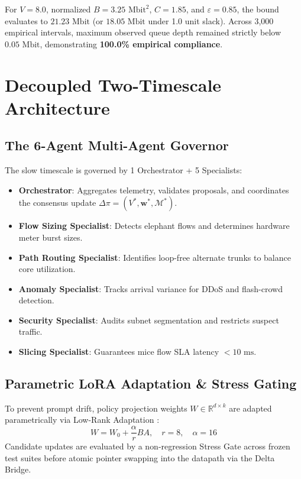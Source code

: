 \documentclass[conference]{IEEEtran}
\begin{document}
For $V=8.0$, normalized $B=3.25\text{ Mbit}^2$, $C=1.85$, and $\varepsilon=0.85$, the bound evaluates to $21.23\text{ Mbit}$ (or $18.05\text{ Mbit}$ under 1.0 unit slack). Across 3,000 empirical intervals, maximum observed queue depth remained strictly below $0.05\text{ Mbit}$, demonstrating \textbf{100.0\% empirical compliance}.

\section{Decoupled Two-Timescale Architecture}
\subsection{The 6-Agent Multi-Agent Governor}
The slow timescale is governed by 1 Orchestrator + 5 Specialists:
\begin{itemize}
    \item \textbf{Orchestrator}: Aggregates telemetry, validates proposals, and coordinates the consensus update $\Delta\pi = (V^*, \mathbf{w}^*, \mathcal{M}^*)$.
    \item \textbf{Flow Sizing Specialist}: Detects elephant flows and determines hardware meter burst sizes.
    \item \textbf{Path Routing Specialist}: Identifies loop-free alternate trunks to balance core utilization.
    \item \textbf{Anomaly Specialist}: Tracks arrival variance for DDoS and flash-crowd detection.
    \item \textbf{Security Specialist}: Audits subnet segmentation and restricts suspect traffic.
    \item \textbf{Slicing Specialist}: Guarantees mice flow SLA latency $< 10\text{ ms}$.
\end{itemize}

\subsection{Parametric LoRA Adaptation \& Stress Gating}
To prevent prompt drift, policy projection weights $W \in \mathbb{R}^{d \times k}$ are adapted parametrically via Low-Rank Adaptation \cite{hu2022lora}:
\begin{equation}
W = W_0 + \frac{\alpha}{r} B A, \quad r=8, \quad \alpha=16
\end{equation}
Candidate updates are evaluated by a non-regression Stress Gate across frozen test suites before atomic pointer swapping into the datapath via the Delta Bridge.
\end{document}
